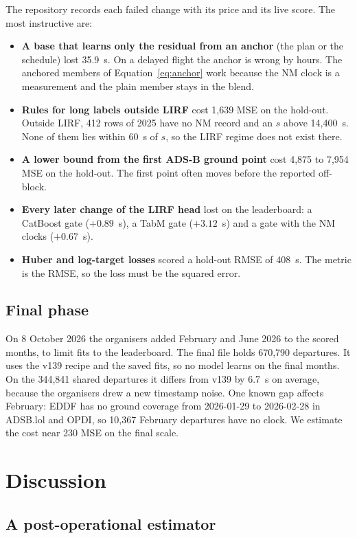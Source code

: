 \documentclass[
  manuscript=article,
  layout=preprint,
  year=2026,
  volume=x,
]{extra/joas}
\begin{document}
The repository records each failed change with its price and its live score. The most instructive are:
\begin{itemize}
  \item \textbf{A base that learns only the residual from an anchor} (the plan or the schedule) lost 35.9~s. On a delayed flight the anchor is wrong by hours. The anchored members of Equation~\ref{eq:anchor} work because the NM clock is a measurement and the plain member stays in the blend.
  \item \textbf{Rules for long labels outside LIRF} cost 1,639 MSE on the hold-out. Outside LIRF, 412 rows of 2025 have no NM record and an $s$ above 14,400~s. None of them lies within 60~s of $s$, so the LIRF regime does not exist there.
  \item \textbf{A lower bound from the first ADS-B ground point} cost 4,875 to 7,954 MSE on the hold-out. The first point often moves before the reported off-block.
  \item \textbf{Every later change of the LIRF head} lost on the leaderboard: a CatBoost gate ($+0.89$~s), a TabM gate ($+3.12$~s) and a gate with the NM clocks ($+0.67$~s).
  \item \textbf{Huber and log-target losses} scored a hold-out RMSE of 408~s. The metric is the RMSE, so the loss must be the squared error.
\end{itemize}

\subsection{Final phase}

On 8 October 2026 the organisers added February and June 2026 to the scored months, to limit fits to the leaderboard. The final file holds 670,790 departures. It uses the v139 recipe and the saved fits, so no model learns on the final months. On the 344,841 shared departures it differs from v139 by 6.7~s on average, because the organisers drew a new timestamp noise. One known gap affects February: EDDF has no ground coverage from 2026-01-29 to 2026-02-28 in ADSB.lol and OPDI, so 10,367 February departures have no clock. We estimate the cost near 230 MSE on the final scale.


\section{Discussion}
\label{sec:discussion}

\subsection{A post-operational estimator}
\end{document}
